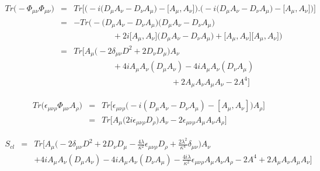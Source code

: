 \documentclass[10pt]{book}
\theoremstyle{break}
\begin{document}
\begin{eqnarray*}
 Tr\big( - \Phi_{\mu \nu} \Phi_{\mu \nu} \big) &=& Tr\Bigg[  \Bigg( - i \Big( D_{\mu} A_{\nu}  -  D_{\nu} A_{\mu} \Big) - \Big[A_{\mu},A_{\nu} \Big] \Bigg) . \Bigg( - i \Big( D_{\mu} A_{\nu}  -  D_{\nu} A_{\mu} \Big) - \Big[A_{\mu},A_{\nu}\Big] \Bigg) \Bigg] \nonumber \\
 &=& - Tr\Bigg( - \Big( D_{\mu} A_{\nu}  -  D_{\nu} A_{\mu} \Big) \Big( D_{\mu} A_{\nu}  -  D_{\nu} A_{\mu} \Big) \nonumber \\
 && \hspace{2cm} + 2i \Big[A_{\mu},A_{\nu}\Big] \Big( D_{\mu} A_{\nu} -  D_{\nu} A_{\mu} \Big) + \Big[A_{\mu},A_{\nu}\Big] \Big[A_{\mu},A_{\nu}\Big] \Bigg) \nonumber \\
 &=& Tr\Bigg[ A_\mu \Big( - 2 \delta_{\mu \nu} D^2 + 2 D_\nu D_\mu \Big) A_\nu \nonumber \\
 && \hspace{2cm} + 4i A_\mu A_\nu (D_\mu A_\nu) - 4i A_\mu A_\nu (D_\nu A_\mu) \nonumber \\
 && \hspace{5cm} + 2 A_\mu A_\nu A_\mu A_\nu - 2 A^4 \Bigg] 
\end{eqnarray*}

\begin{eqnarray*}
 Tr\big( \epsilon_{\mu \nu \rho} \Phi_{\mu \nu} A_\rho \big) &=& Tr\Big[ \epsilon_{\mu \nu \rho} \big( - i ( D_{\mu} A_{\nu} - D_{\nu} A_{\mu} ) - [ A_{\mu} , A_{\nu} ] \big) A_\rho \Big] \nonumber \\
 &=& Tr\Big[ A_\mu \big( 2 i \epsilon_{\mu \nu \rho}  D_\rho \big) A_\nu - 2 \epsilon_{\mu \nu \rho} A_\mu A_\nu A_\rho \Big]
\end{eqnarray*}

\begin{eqnarray*}
 S_{cl} &=& Tr \Bigg[ A_\mu \big( - 2 \delta_{\mu \nu} D^2 + 2 D_\nu D_\mu - \frac{4\lambda}{\kappa^2} \epsilon_{\mu \nu \rho}  D_\rho + \frac{2\lambda^2}{\kappa^4} \delta_{\mu \nu} \big) A_\nu \nonumber \\ 
 && + 4i A_\mu A_\nu (D_\mu A_\nu) - 4i A_\mu A_\nu (D_\nu A_\mu) - \frac{4i\lambda}{\kappa^2} \epsilon_{\mu \nu \rho} A_\mu A_\nu A_\rho  - 2 A^4 + 2 A_\mu A_\nu A_\mu A_\nu \Bigg] \nonumber \\
\end{eqnarray*} 


\end{document}
